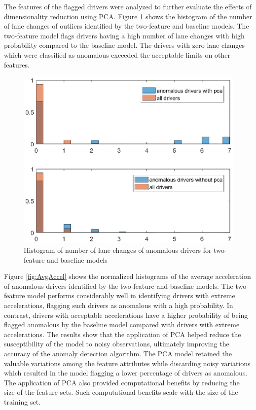 \documentclass[10pt,journal]{IEEEtran}
\begin{document}
The features of the flagged drivers were analyzed to further evaluate the effects of dimensionality reduction using PCA. Figure \ref{fig:NumLanes} shows the histogram of the number of lane changes of outliers identified by the two-feature and baseline models. The two-feature model flags drivers having a high number of lane changes with high probability compared to the baseline model. The drivers with zero lane changes which were classified as anomalous exceeded the acceptable limits on other features.

\begin{figure}[!t]
	\centering
    \includegraphics[width=0.9\columnwidth]{"Figures/num_lanes"}
    \caption{Histogram of number of lane changes of anomalous drivers for two-feature and baseline models}
    \label{fig:NumLanes}
\end{figure}

Figure \ref{fig:AvgAccel} shows the normalized histograms of the average acceleration of anomalous drivers identified by the two-feature and baseline models. The two-feature model performs considerably well in identifying drivers with extreme accelerations, flagging such drivers as anomalous with a high probability. In contrast, drivers with acceptable accelerations have a higher probability of being flagged anomalous by the baseline model compared with drivers with extreme accelerations. The results show that the application of PCA helped reduce the susceptibility of the model to noisy observations, ultimately improving the accuracy of the anomaly detection algorithm. The PCA model retained the valuable variations among the feature attributes while discarding noisy variations which resulted in the model flagging a lower percentage of drivers as anomalous. The application of PCA also provided computational benefits by reducing the size of the feature sets. Such computational benefits scale with the size of the training set.
\end{document}

